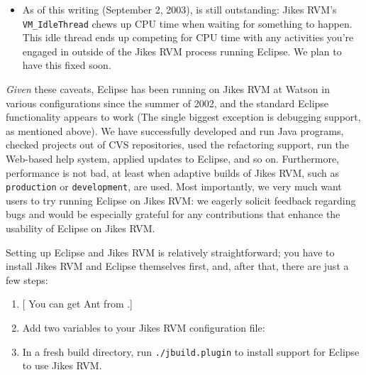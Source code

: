 \begin{itemize}
\item As of this writing (September 2, 2003), 
 is still outstanding:
Jikes RVM's {\tt VM\_IdleThread} chews up CPU time when waiting for
something to happen.  This idle thread ends up competing for CPU time
with any activities you're engaged in outside of the Jikes RVM process
running Eclipse.  We plan to have this fixed soon.

\end{itemize}

{\it Given} these caveats, Eclipse has been running on Jikes RVM at
Watson in various configurations since the summer of 2002, and the
standard Eclipse functionality appears to work (The single biggest
exception is debugging support, as mentioned above).  We have
successfully developed and run Java programs, checked projects out of
CVS repositories, used the refactoring support, run the Web-based help
system, applied updates to Eclipse, and so on.  Furthermore,
performance is not bad, at least when adaptive builds of Jikes RVM,
such as {\tt production} or {\tt development}, are used.  Most
importantly, we very much want users to try running Eclipse on Jikes
RVM: we eagerly solicit feedback regarding bugs and would be
especially grateful for any contributions that enhance the usability
of Eclipse on Jikes RVM.

Setting up Eclipse and Jikes RVM is relatively straightforward; you
have to install Jikes RVM and Eclipse themselves first, and, after
that, there are just a few steps:
\begin{enumerate}
\item {}[  You can get Ant from {\tt \antURL}.]{\antURL} 
\item Add two variables to your Jikes RVM configuration file:
\item In a fresh build directory, run {\tt ./jbuild.plugin} to install
support for Eclipse to use Jikes RVM.
\end{enumerate}


